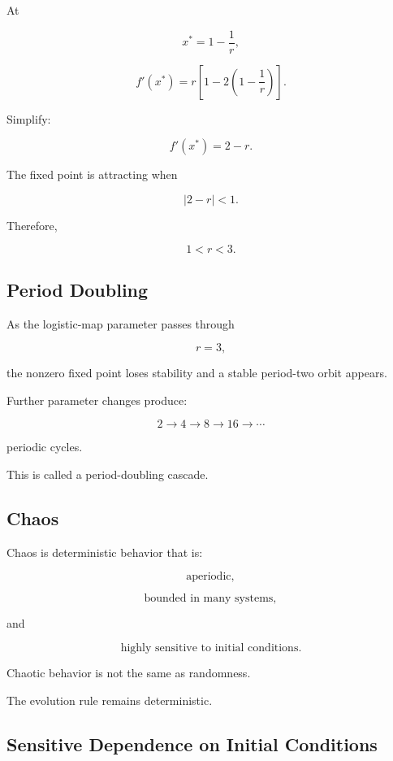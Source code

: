 At

\[
x^*
=
1-\frac1r,
\]

\[
f'(x^*)
=
r
\left[
1
-
2
\left(
1-\frac1r
\right)
\right].
\]

Simplify:

\[
\boxed{
f'(x^*)
=
2-r.
}
\]

The fixed point is attracting when

\[
|2-r|<1.
\]

Therefore,

\[
\boxed{
1<r<3.
}
\]

\subsection{Period Doubling}
\label{subsec:period-doubling}

As the logistic-map parameter passes through

\[
r=3,
\]

the nonzero fixed point loses stability and a stable period-two orbit
appears.

Further parameter changes produce:

\[
\boxed{
2
\rightarrow
4
\rightarrow
8
\rightarrow
16
\rightarrow
\cdots
}
\]

periodic cycles.

This is called a period-doubling cascade.

\subsection{Chaos}
\label{subsec:dynamical-chaos}

Chaos is deterministic behavior that is:

\[
\boxed{
\text{aperiodic},
}
\]

\[
\boxed{
\text{bounded in many systems},
}
\]

and

\[
\boxed{
\text{highly sensitive to initial conditions}.
}
\]

Chaotic behavior is not the same as randomness.

The evolution rule remains deterministic.

\subsection{Sensitive Dependence on Initial Conditions}
\label{subsec:sensitive-dependence}

